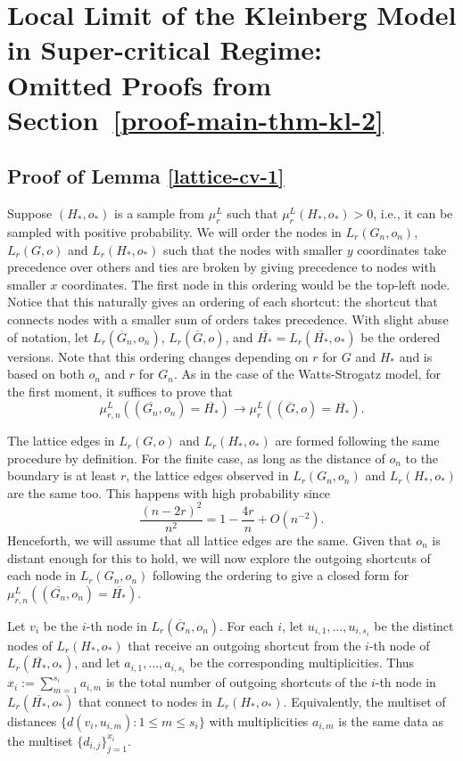 \documentclass[10pt]{amsart}
\begin{document}
\section{Local Limit of the Kleinberg Model in Super-critical Regime: \\ Omitted Proofs from Section~\ref{proof-main-thm-kl-2}} \label{moment-kl}

\subsection*{Proof of Lemma
\ref{lattice-cv-1}}
Suppose \((H_*, o_*)\) is a sample from \(\mu_r^L\) such that \(\mu_r^L(H_*, o_*) > 0\), i.e., it can be sampled with positive probability. 
We will order the nodes in $L_r(G_n, o_n)$, $L_r(G, o)$ and $L_r(H_*,o_*)$ such that the nodes with smaller $y$ coordinates take precedence over others and ties are broken by giving precedence to nodes with smaller $x$ coordinates. The first node in this ordering would be the top-left node. Notice that this naturally gives an ordering of each shortcut: the shortcut that connects nodes with a smaller sum of orders takes precedence. With slight abuse of notation, let $L_r(\overline{G}_n, o_n)$,  $L_r(\overline{G}, o)$, and $\overline{H_*} = L_r(\overline{H_*},o_*)$ be the ordered versions. Note that this ordering changes depending on $r$ for $G$ and $H_*$ and is based on both $o_n$ and $r$ for $G_n$. As in the case of the Watts-Strogatz model, for the first moment, it suffices to prove that 
\[
\mu_{r, n}^L((\overline{G_n},o_n) = \overline{H_*}) \to \mu_{r}^L((\overline{G},o) = \overline{H_*}).
\]

The lattice edges in $L_r(G, o)$ and $L_r(H_*,o_*)$ are formed following the same procedure by definition. 
For the finite case, as long as the distance of $o_n$ to the boundary is at least $r$, the lattice edges observed in $L_r(G_n, o_n)$ and $L_r(H_*,o_*)$ are the same too. This happens with high probability since
\[
\frac{(n-2r)^2}{n^2}=1-\frac{4r}{n} + O(n^{-2}).
\]
Henceforth, we will assume that all lattice edges are the same. Given that $o_n$ is distant enough for this to hold, we will now explore the outgoing shortcuts of each node in $L_r(G_n, o_n)$ following the ordering to give a closed form for $\mu_{r, n}^L((\overline{G_n},o_n) = \overline{H_*})$. 

Let $v_i$ be the $i$-th node in $L_r(\overline{G}_n, o_n)$. For each $i$, let
\(
u_{i,1},\dots,u_{i,s_i}
\)
be the distinct nodes of $L_r(H_*,o_*)$ that receive an outgoing shortcut from the $i$-th node of $L_r(\overline{H_*},o_*)$, and let
\(
a_{i,1},\dots,a_{i,s_i}
\)
be the corresponding multiplicities. Thus
\(
x_i:=\sum_{m=1}^{s_i} a_{i,m}
\)
is the total number of outgoing shortcuts of the $i$-th node in $L_r(\overline{H_*},o_*)$ that connect to nodes in $L_r(H_*,o_*)$. Equivalently, the multiset of distances
\(
\{d(v_i,u_{i,m}) : 1\le m\le s_i\}
\)
with multiplicities \(a_{i,m}\) is the same data as the multiset \(\{d_{i,j}\}_{j=1}^{x_i}\).
\end{document}
